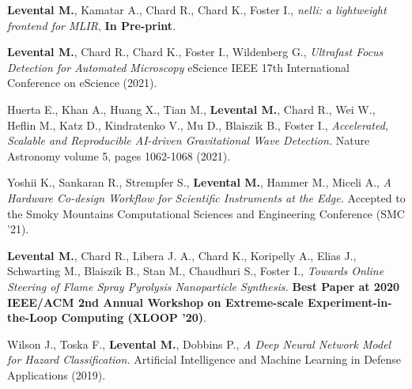 \documentclass[11pt,letterpaper,roman,colorlinks,linkcolor=blue]{moderncv}
\begin{document}
\begin{hangingpar}
\textbf{Levental M.}, Kamatar A., Chard R., Chard K., Foster I.,
\textit{nelli: a lightweight frontend for MLIR},
\textbf{In Pre-print}.
\end{hangingpar}

\begin{hangingpar}
\textbf{Levental M.}, Chard R., Chard K., Foster I., Wildenberg G.,
\textit{Ultrafast Focus Detection for Automated Microscopy} 
eScience IEEE 17th International Conference on eScience (2021).
\end{hangingpar}


\begin{hangingpar}
Huerta E., Khan A., Huang X., Tian M., \textbf{Levental M.}, Chard R., Wei W., Heflin M., Katz D., Kindratenko V., Mu D., Blaiszik B., Foster I.,
\textit{Accelerated, Scalable and Reproducible AI-driven Gravitational Wave Detection.} 
Nature Astronomy volume 5, pages 1062-1068 (2021).
\end{hangingpar}

\begin{hangingpar}
Yoshii K., Sankaran R., Strempfer S., \textbf{Levental M.}, Hammer M., Miceli A.,
\textit{A Hardware Co-design Workflow for Scientific Instruments at the Edge.} 
Accepted to the Smoky Mountains Computational Sciences and Engineering Conference (SMC '21).
\end{hangingpar}

\begin{hangingpar}
\textbf{Levental M.}, Chard R., Libera J. A., Chard K., Koripelly A., Elias J., Schwarting M., Blaiszik B., Stan M., Chaudhuri S., Foster I.,
\textit{Towards Online Steering of Flame Spray Pyrolysis Nanoparticle Synthesis.} 
\textbf{Best Paper at 2020 IEEE/ACM 2nd Annual Workshop on Extreme-scale Experiment-in-the-Loop Computing (XLOOP '20)}.
\end{hangingpar}

\begin{hangingpar}
Wilson J., Toska F., \textbf{Levental M.}, Dobbins P.,
\textit{A Deep Neural Network Model for Hazard Classification.}
Artificial Intelligence and Machine Learning in Defense Applications (2019).
\end{hangingpar}
\end{document}
